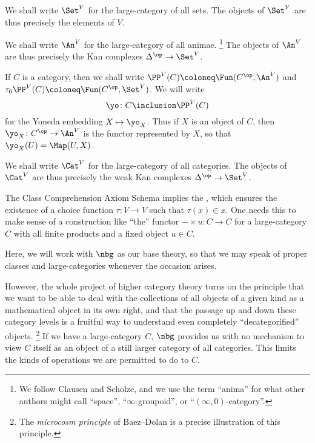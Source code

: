 \begin{notation}%
	\label{not:Vsetsanimaepresheavescategories}
	We shall write $ \Set^V $ for the large-category of all sets.
	The objects of $ \Set^V$ are thus precisely the elements of $V$.

	We shall write $ \An^V $ for the large-category of all animae.%
	\footnote{We follow Clausen and Scholze,
		and we use the term \enquote{anima} for
		what other authors might call
		\enquote{space},
		\enquote{$ \infty $-groupoid}, or
		\enquote{$ (\infty,0) $-category}.}	
	The objects of $ \An^V $ are thus precisely
	the Kan complexes $ \Delta^{\op} \to \Set^V $.

	If $ C $ is a category, then
	we shall write $ \PP^V(C) \coloneq \Fun(C^{\op}, \An^V) $
	and $ \tau_0\PP^V(C) \coloneq \Fun(C^{\op}, \Set^V) $.
	We will write
	\[ \yo \colon C \inclusion \PP^V(C) \]
	for the Yoneda embedding $ X \mapsto \yo_X $.
	Thus if $ X $ is an object of $ C $, then
	$ \yo_X \colon C^{\op} \to \An^V $ is
	the functor represented by $ X $, so that
	$ \yo_X(U) = \Map(U, X) $.

	We shall write $ \Cat^V $ for the large-category of all categories.
	The objects of $ \Cat^V $ are thus precisely
	the weak Kan complexes $ \Delta^{\op} \to \Set^V $.
\end{notation}

The Class Comprehension Axiom Schema implies the ,
which ensures the existence of a choice function $ \tau \colon V \to V $ such that $ \tau(x) \in x $.
One needs this to make sense of a construction
like \enquote{the} functor $ - \times u \colon C \to C $ for a large-category $ C $
with all finite products and a fixed object $ u \in C $.

Here, we will work with $\nbg$ as our base theory,
so that we may speak of proper classes and large-categories
whenever the occasion arises.

However, the whole project of higher category theory turns on the principle that
we want to be able to deal with the collections of all objects of a given kind
as a mathematical object in its own right,
and that the passage up and down these category levels
is a fruitful way to understand even completely \enquote{decategorified} objects.%
\footnote{The \emph{microcosm principle} of Baez--Dolan is a
precise illustration of this principle.} 
If we have a large-category $C$,
$ \nbg $ provides us with no mechanism
to view $C$ itself as an object
of a still larger category of all categories.
This limits the kinds of operations we are permitted to do to $ C $.

